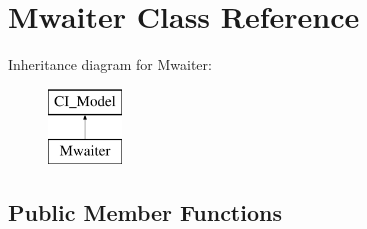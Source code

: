 \hypertarget{class_mwaiter}{}\section{Mwaiter Class Reference}
\label{class_mwaiter}
Inheritance diagram for Mwaiter\+:\begin{figure}[H]
\begin{center}
\leavevmode
\includegraphics[height=2.000000cm]{class_mwaiter}
\end{center}
\end{figure}
\subsection*{Public Member Functions}
